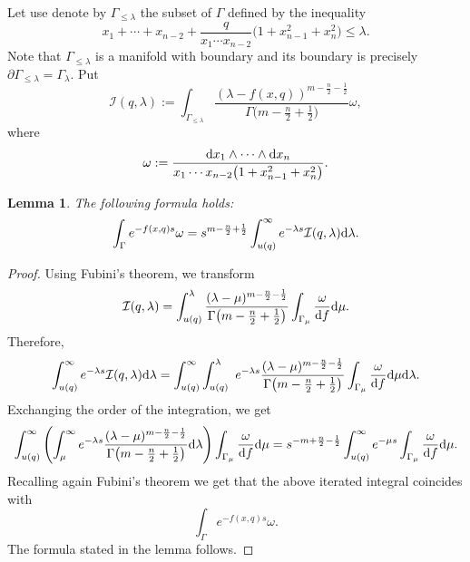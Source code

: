 \documentclass[pdftex]{sigma}
\numberwithin{equation}{section}
\newtheorem{Lemma}[Theorem]{Lemma}
\begin{document}
Let use denote by $\Gamma_{\leq \lambda}$ the subset of $\Gamma$ defined by
the inequality
\[
x_1+\cdots + x_{n-2} +
\frac{q}{x_1\cdots x_{n-2}}
\big(1+x_{n-1}^2+x_n^2\big) \leq \lambda.
\]
Note that $\Gamma_{\leq \lambda}$ is a manifold with boundary and its
boundary is precisely $\partial \Gamma_{\leq
 \lambda}=\Gamma_\lambda$. Put
\[
\mathcal{I}(q,\lambda) :=
\int_{\Gamma_{\leq \lambda}} \frac{
(\lambda-f(x,q))^{m-\frac{n}{2}-\frac{1}{2}} }{
\Gamma\big( m-\frac{n}{2}+\frac{1}{2} \big) }
\omega,
\]
where
\[
\omega:= \frac{{\rm d}x_1\wedge \cdots \wedge {\rm d}x_n}{
x_1\cdots x_{n-2}\big(1+x_{n-1}^2+ x_n^2\big) }.
\]
\begin{Lemma}\label{le:Lapl_I}
The following formula holds:
\[
\int_\Gamma e^{-f(x,q) s} \omega=
s^{m-\frac{n}{2}+\frac{1}{2}}
\int_{u(q)}^\infty e^{-\lambda s} \mathcal{I}(q,\lambda) {\rm d}\lambda.
\]
\end{Lemma}
\begin{proof}
Using Fubini's theorem, we transform
\[
\mathcal{I}(q,\lambda) = \int_{u(q)}^\lambda
\frac{(\lambda-\mu)^{m-\frac{n}{2}-\frac{1}{2}} }{
\Gamma\big(m-\frac{n}{2}+\frac{1}{2}\big) }
\int_{\Gamma_\mu} \frac{\omega}{{\rm d}f} {\rm d}\mu.
\]
Therefore,
\[
\int_{u(q)}^\infty e^{-\lambda s} \mathcal{I}(q,\lambda) {\rm d}\lambda =
\int_{u(q)}^\infty
\int_{u(q)}^\lambda \ e^{-\lambda s}
\frac{(\lambda-\mu)^{m-\frac{n}{2}-\frac{1}{2}} }{
\Gamma\big(m-\frac{n}{2}+\frac{1}{2}\big) }
\int_{\Gamma_\mu} \frac{\omega}{{\rm d}f} {\rm d}\mu {\rm d}\lambda.
\]
Exchanging the order of the integration, we get
\[
\int_{u(q)}^\infty
\left(
\int_\mu^\infty
e^{-\lambda s}
\frac{(\lambda-\mu)^{m-\frac{n}{2}-\frac{1}{2}} }{
\Gamma\big(m-\frac{n}{2}+\frac{1}{2}\big) } {\rm d}\lambda \right)
\int_{\Gamma_\mu} \frac{\omega}{{\rm d}f} {\rm d}\mu =
s^{-m+\frac{n}{2} -\frac{1}{2}}
\int_{u(q)}^\infty
e^{-\mu s}
\int_{\Gamma_\mu} \frac{\omega}{{\rm d}f} {\rm d}\mu.
\]
Recalling again Fubini's theorem we get that the above iterated
integral coincides with \[\int_\Gamma e^{-f(x,q) s} \omega.\] The
formula stated in the lemma follows.
\end{proof}
\end{document}
